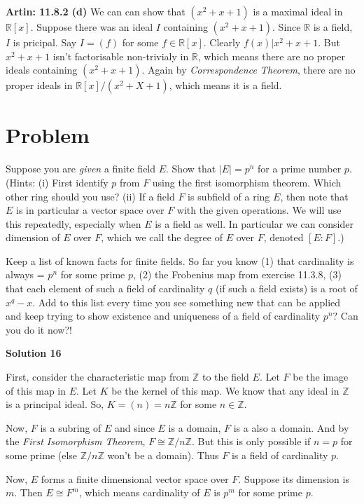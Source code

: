 \documentclass[12pt,a4paper]{article}
\theoremstyle{definition}
\begin{document}
\begin{flushleft}
\medskip

{\bf Artin: 11.8.2 (d)} We can can show that $(x^2 +x +1)$ is a maximal ideal in $\mathbb{R}[x]$. Suppose there was an ideal $I$ containing $(x^2 + x +1)$. Since $\mathbb{R}$ is a field, $I$ is pricipal. Say $I = (f)$ for some $f \in \mathbb{R}[x]$. Clearly $f(x) | x^2+x+1$. But $x^2 + x + 1$ isn't factorisable non-trivialy in $\mathbb{R}$, which means there are no proper ideals containing $(x^2 + x + 1)$. Again by {\it Correspondence Theorem}, there are no proper ideals in $\mathbb{R}[x]/(x^2 + X +1)$, which means it is a field.

\newpage

\setcounter{section}{15}
\section{Problem}

Suppose you are {\it given} a finite field $E$. Show that $ |E| = p^n$ for a prime number $p$. (Hints: (i) First identify $p$ from $F$ using the first isomorphism theorem. Which other ring should you use? (ii) If a field $F$ is subfield of a ring $E$, then note that $E$ is in particular a vector space over $F$ with the given operations. We will use this repeatedly, especially when $E$ is a field as well. In particular we can consider dimension of $E$ over $F$, which we call the degree of $E$ over $F$, denoted $[E:F]$.)

\medskip

Keep a list of known facts for finite fields. So far you know (1)  that cardinality is always = $p^n$  for some prime $p$, (2) the Frobenius map from exercise 11.3.8, (3) that each element of such a field of cardinality $q$ (if such a field exists) is a root of $x^q - x$. Add to this list every time you see something new that can be applied and keep trying to show existence and uniqueness of a field of cardinality $p^n?$ Can you do it now?! %

\bigskip

{\bf Solution 16}

\medskip

First, consider the characteristic map from $\mathbb{Z}$ to the field $E$. Let $F$ be the image of this map in $E$. Let $K$ be the kernel of this map. We know that any ideal in $\mathbb{Z}$ is a principal ideal. So, $K = (n) = n\mathbb{Z}$ for some $n \in \mathbb{Z}$.

\medskip

Now, $F$ is a subring of $E$ and since $E$ is a domain, $F$ is a also a domain. And by the {\it First Isomorphism Theorem}, $F \cong \mathbb{Z}/n\mathbb{Z}$. But this is only possible if $n = p$ for some prime (else $\mathbb{Z}/n\mathbb{Z}$ won't be a domain). Thus $F$ is a field of cardinality $p$.

\medskip

Now, $E$ forms a finite dimensional vector space over $F$. Suppose its dimension is $m$. Then $E \cong F^m$, which means cardinality of $E$ is $p^m$ for some prime $p$.

\newpage

\end{flushleft}
\end{document}
